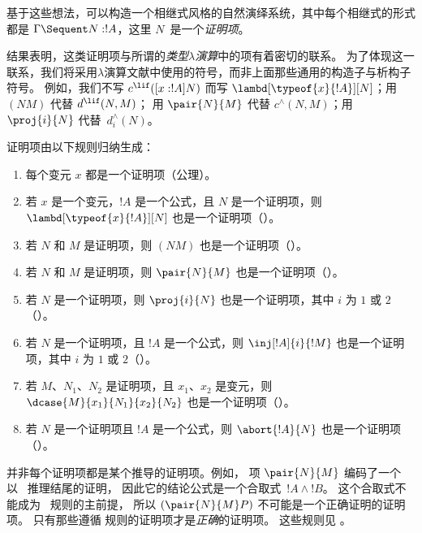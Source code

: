 \documentclass[../../../include/open-logic-section]{subfiles}
\begin{document}
基于这些想法，可以构造一个相继式风格的自然演绎系统，其中每个相继式的形式都是 $\Gamma \Sequent N : !A$，这里 $N$~是一个\emph{证明项}。

结果表明，这类证明项与所谓的\emph{类型$\lambda$演算}中的项有着密切的联系。
为了体现这一联系，我们将采用$\lambda$演算文献中使用的符号，而非上面那些通用的构造子与析构子符号。
例如，我们不写 $c^{\lif}([x:!A]N)$ 而写 $\lambd[\typeof{x}{!A}][N]$；用 $(NM)$ 代替 $d^{\lif}(N,M)$；
用 $\pair{N}{M}$ 代替 $c^\land(N,M)$；用 $\proj{i}{N}$ 代替~$d^\land_i(N)$。

\begin{defn}
  证明项由以下规则归纳生成：
  \begin{enumerate}
  \item 每个变元 $x$ 都是一个证明项（公理）。
  \item 若 $x$ 是一个变元，$!A$ 是一个公式，且 $N$ 是一个证明项，则 $\lambd[\typeof{x}{!A}][N]$ 也是一个证明项（\Intro\lif）。
  \item 若 $N$ 和 $M$ 是证明项，则 $(NM)$ 也是一个证明项（\Elim\lif）。
  \item 若 $N$ 和 $M$ 是证明项，则 $\pair{N}{M}$ 也是一个证明项（\Intro\land）。
  \item 若 $N$ 是一个证明项，则 $\proj{i}{N}$ 也是一个证明项，其中 $i$ 为 $1$ 或 $2$（\Elim\land[i]）。
  \item 若 $N$ 是一个证明项，且 $!A$ 是一个公式，则 $\inj[!A]{i}{!M}$ 也是一个证明项，其中 $i$ 为 $1$ 或 $2$（\Intro\lor[i]）。
  \item 若 $M$、$N_1$、$N_2$ 是证明项，且 $x_1$、$x_2$ 是变元，则 $\dcase{M}{x_1}{N_1}{x_2}{N_2}$ 也是一个证明项（\Elim\lor）。
  \item 若 $N$ 是一个证明项且 $!A$ 是一个公式，则 $\abort{!A}{N}$ 也是一个证明项（\FalseInt）。
  \end{enumerate}
\end{defn}

并非每个证明项都是某个推导的证明项。例如，
项 $\pair{N}{M}$ 编码了一个以~\Intro{\land} 推理结尾的证明，
因此它的结论公式是一个合取式~$!A \land !B$。
这个合取式不能成为~\Elim{\lif} 规则的主前提，
所以 $(\pair{N}{M}P)$ 不可能是一个正确证明的证明项。
只有那些遵循  规则的证明项才是\emph{正确}的证明项。
这些规则见 。


\end{document}
